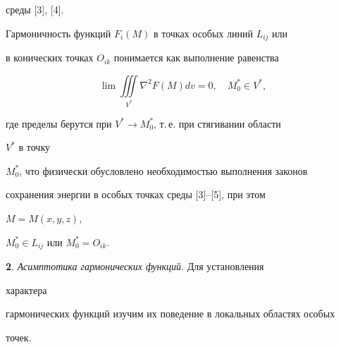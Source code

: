 среды [3], [4]. 


Гармоничность функций $F_i(M)$ в точках особых линий $L_{i j}$ или 


в конических точках $O_{i k}$ понимается как выполнение равенства 


\begin{equation} 


\lim\iiint\limits_{V^*}\nabla^2F(M)d v=0,\quad M^*_0\in V^*, 


\end{equation} 


где пределы берутся при $V^*\to M^*_0$, т.\,е. при стягивании области 


$V^*$ в точку  


$M^*_0$, что физически обусловлено необходимостью выполнения законов  


сохранения энергии в особых точках среды [3]--[5], при этом 


$M=M(x,y,z)$, 


$M^*_0\in L_{i j}$ или $M^*_0=O_{i k}$. 


\medskip 


 


{\bf 2}. {\it Асимптотика гармонических функций}. Для установления 


характера 


гармонических функций изучим их поведение в локальных областях особых 


точек. 


 


